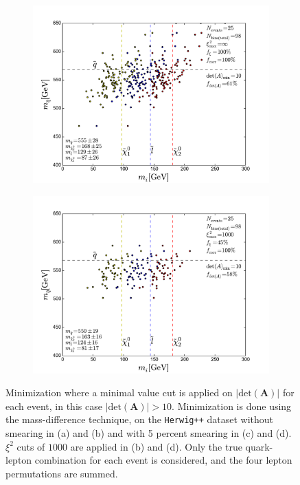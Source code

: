 \documentclass[twoside,english]{uiofysmaster}
\begin{document}
\begin{figure}[hbt]
	\begin{subfigure}[b]{0.45\textwidth}
		\includegraphics[width=\textwidth]{figures/improving_combinatorics/herwigpp-5psmear-4combosum-detAcut_10-xisqcut_none-nocomb-TMP.pdf} 
		\caption{ }
		\label{fig:detAcut_c}
	\end{subfigure}
	\begin{subfigure}[b]{0.45\textwidth}
		\includegraphics[width=\textwidth]{figures/improving_combinatorics/herwigpp-5psmear-4combosum-detAcut_10-xisqcut_1000-nocomb-TMP.pdf}
		\caption{ } 
		\label{fig:detAcut_d}
	\end{subfigure}
	\caption{Minimization where a minimal value cut is applied on $|\mathrm{det}(\mathbf A)|$ for each event, in this case $|\mathrm{det}(\mathbf A)|>10$. Minimization is done using the mass-difference technique, on the {\tt Herwig++} dataset without smearing in (a) and (b) and with 5 percent smearing in (c) and (d). $\xi^2$ cuts of $1000$ are applied in (b) and (d). Only the true quark-lepton combination for each event is considered, and the four lepton permutations are summed.}
	\label{fig:detAcut}
\end{figure}
\end{document}
